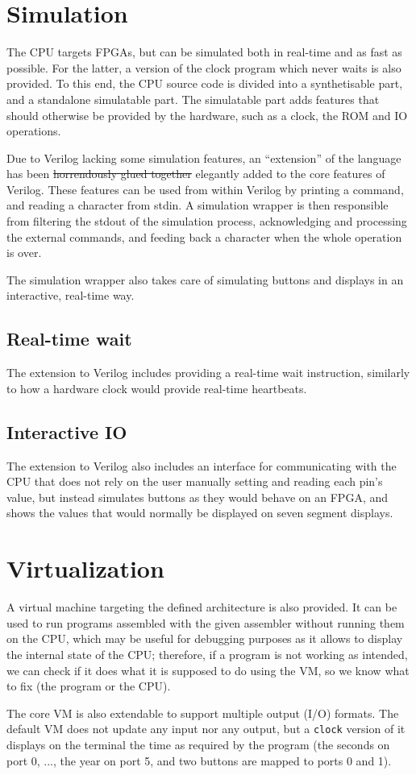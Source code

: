 \documentclass{scrartcl}
\begin{document}
\section*{Simulation}
The CPU targets FPGAs, but can be simulated both in real-time and as
fast as possible. For the latter, a version of the clock program
which never waits is also provided. To this end, the CPU source code
is divided into a synthetisable part, and a standalone simulatable
part. The simulatable part adds features that should otherwise be
provided by the hardware, such as a clock, the ROM and IO operations.\par
Due to Verilog lacking some simulation features, an ``extension'' of
the language has been \sout{horrendously glued together} elegantly
added to the core features of Verilog. These features can be used from
within Verilog by printing a command, and reading a character from
stdin. A simulation wrapper is then responsible from filtering the
stdout of the simulation process, acknowledging and processing the
external commands, and feeding back a character when the whole
operation is over.\par
The simulation wrapper also takes care of simulating buttons and
displays in an interactive, real-time way.
\subsection*{Real-time wait}
The extension to Verilog includes providing a real-time wait
instruction, similarly to how a hardware clock would provide real-time
heartbeats.

\subsection*{Interactive IO}
The extension to Verilog also includes an interface for communicating
with the CPU that does not rely on the user manually setting and reading each
pin's value, but instead simulates buttons as they would behave on an
FPGA, and shows the values that would normally be displayed on seven
segment displays.

\section*{Virtualization}
A virtual machine targeting the defined architecture is also provided.
It can be used to run programs assembled with the given assembler
without running them on the CPU, which may be useful for debugging purposes
as it allows to display the internal state of the CPU; therefore, if a
program is not working as intended, we can check if it does what it is
supposed to do using the VM, so we know what to fix (the program or the
CPU).\par
The core VM is also extendable to support multiple output (I/O) formats.
The default VM does not update any input nor any output, but a \verb+clock+
version of it displays on the terminal the time as required by the program
(the seconds on port 0, ..., the year on port 5, and two buttons are mapped
to ports 0 and 1).
\end{document}
